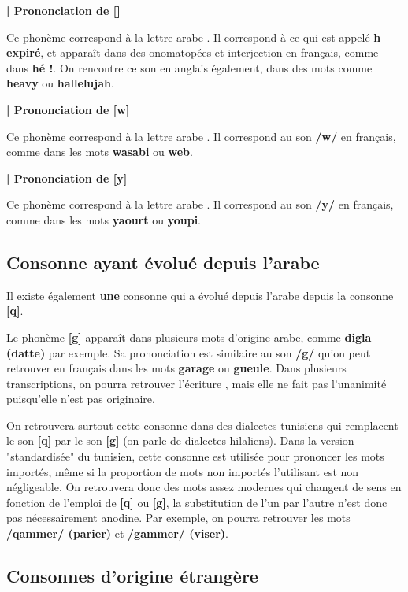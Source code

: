 \textbf{| Prononciation de  [\texthth]}

Ce phonème correspond à la lettre arabe . Il correspond à ce qui est appelé \textbf{h expiré}, et apparaît dans des onomatopées et interjection en français, comme dans \textbf{hé !}. On rencontre ce son en anglais également, dans des mots comme \textbf{heavy} ou \textbf{hallelujah}.


\textbf{| Prononciation de  [w]}

Ce phonème correspond à la lettre arabe . Il correspond au son \textbf{/w/} en français, comme dans les mots \textbf{wasabi} ou \textbf{web}.


\textbf{| Prononciation de  [y]}

Ce phonème correspond à la lettre arabe . Il correspond au son \textbf{/y/} en français, comme dans les mots \textbf{yaourt} ou \textbf{youpi}.


\subsection{Consonne ayant évolué depuis l'arabe}

Il existe également \textbf{une} consonne qui a évolué depuis l'arabe depuis la  consonne \textbf{ [q]}.

Le phonème \textbf{[g]} apparaît dans plusieurs mots d'origine arabe, comme \textbf{digla (datte)} par exemple. Sa prononciation est similaire au son \textbf{/g/} qu'on peut retrouver en français dans les mots \textbf{garage} ou \textbf{gueule}. Dans plusieurs transcriptions, on pourra retrouver l'écriture \textbf{}, mais elle ne fait pas l'unanimité puisqu'elle n'est pas originaire.

On retrouvera surtout cette consonne dans des dialectes tunisiens qui remplacent le son \textbf{[q]} par le son \textbf{[g]} (on parle de dialectes hilaliens). Dans la version "standardisée" du tunisien, cette consonne est utilisée pour prononcer les mots importés, même si la proportion de mots non importés l'utilisant est non négligeable. On retrouvera donc des mots assez modernes qui changent de sens en fonction de l'emploi de \textbf{[q]} ou \textbf{[g]}, la substitution de l'un par l'autre n'est donc pas nécessairement anodine. Par exemple, on pourra retrouver les mots \textbf{/qammer/ (parier)} et \textbf{/gammer/ (viser)}.

\subsection{Consonnes d'origine étrangère}

